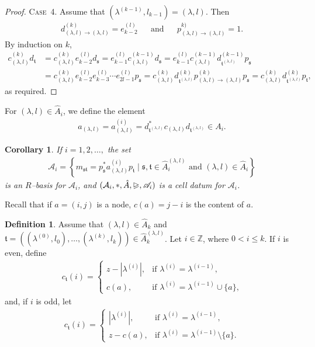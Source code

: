 \documentclass[11pt,a4paper,reqno,svgnames]{amsart}
\theoremstyle{plain}
\newtheorem{corollary}[theorem]{Corollary}
\theoremstyle{definition}
\newtheorem{definition}[theorem]{Definition}
\numberwithin{equation}{section}
\begin{document}
\begin{proof}
{\textsc{Case~4.}} Assume that $(\lambda^{(k-1)},l_{k-1})=(\lambda,l)$. Then 
\begin{align*}
d^{(k)}_{(\lambda,l)\to(\lambda,l)}=e_{k-2}^{(l)}&& \text{and} && p_{(\lambda,l)\to(\lambda,l)}^{k)}=1. 
\end{align*}
By induction on $k$, 
\begin{align*}
c_{(\lambda,l)}^{(k)}d_\mathfrak{t}& =c_{(\lambda,l)}^{(k)}e_{k-2}^{(l)}d_\mathfrak{s} = e_{k-1}^{(l)}c_{(\lambda,l)}^{(k-1)}d_\mathfrak{s} = e_{k-1}^{(l)}c_{(\lambda,l)}^{(k-1)} d_{\mathfrak{t}^{(\lambda,l)}}^{(k-1)}p_\mathfrak{s} \\ 
&= c^{(k)}_{(\lambda,l)}e_{k-2}^{(l)}e_{k-3}^{(l)}\cdots e_{2l-1}^{(l)}p_\mathfrak{s} = c_{(\lambda,l)}^{(k)}d_{\mathfrak{t}^{(\lambda,l)}}^{(k)} p_{(\lambda,l)\to(\lambda,l)}^{(k)}p_\mathfrak{s} =c^{(k)}_{(\lambda,l)}d_{\mathfrak{t}^{(\lambda,l)}}^{(k)} p_\mathfrak{t},
\end{align*}
as required. 
\end{proof}
For $(\lambda,l)\in\hat{A}_i$, we define the element
\begin{align*}
a_{(\lambda,l)}=a_{(\lambda,l)}^{(i)}=d_{\mathfrak{t}^{(\lambda,l)}}^*c_{(\lambda,l)}d_{\mathfrak{t}^{(\lambda,l)}}\in A_i. 
\end{align*}
\begin{corollary}
If $i=1,2,\ldots,$ the set 
\begin{align*}
\mathscr{A}_i=
\left\lbrace 
m_\mathfrak{st}=p_\mathfrak{s}^*a_{(\lambda,l)}^{(i)}p_\mathfrak{t}\mid \mathfrak{s},\mathfrak{t}\in\hat{A}_i^{(\lambda,l)}\text{ and } (\lambda,l)\in\hat{A}_i\right\rbrace
\end{align*} 
is an $R$--basis for $\mathcal{A}_i$, and $(\mathcal{A}_i,*,\hat{A},{\trianglerighteqslant},\mathscr{A}_i)$ is a cell datum for $\mathcal{A}_i$. 
\end{corollary}
Recall that if $a=(i,j)$ is a node, $c(a)=j-i$ is the content of $a$.
\begin{definition}
Assume that $(\lambda,l)\in\hat{A}_k$ and $\mathfrak{t}=((\lambda^{(0)},l_0),\ldots,(\lambda^{(k)},l_k))\in\hat{A}_k^{(\lambda,l)}$. Let $i\in \mathbb{Z}$, where $0< i{\leqslant} k$.  If $i$ is even, define  
\begin{align*}
c_\mathfrak{t}(i)=
\begin{cases}
z-|\lambda^{(i)}|,&\text{if $\lambda^{(i)}=\lambda^{(i-1)}$,}\\
c(a),&\text{if $\lambda^{(i)}=\lambda^{(i-1)}\cup\lbrace a\rbrace$,}
\end{cases}
\end{align*}
and, if $i$ is odd, let
\begin{align*}
c_\mathfrak{t}(i)=
\begin{cases}
|\lambda^{(i)}|, &\text{if $\lambda^{(i)}=\lambda^{(i-1)}$,}\\
z-c(a),&\text{if $\lambda^{(i)}=\lambda^{(i-1)}\setminus \lbrace a\rbrace$.}
\end{cases}
\end{align*}
\end{definition}
\end{document}
